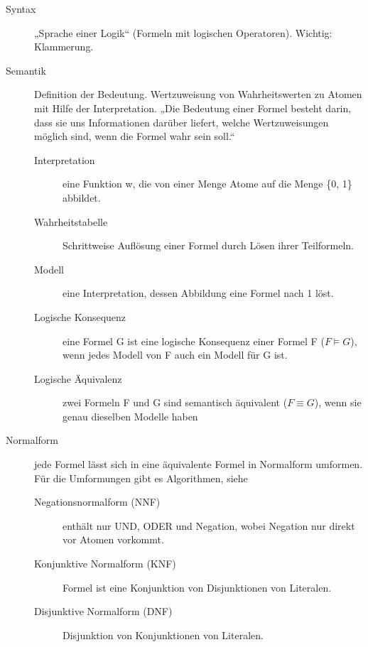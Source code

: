 \begin{description}
        \item[Syntax] „Sprache einer Logik“ (Formeln mit logischen Operatoren). Wichtig: Klammerung.
        \item[Semantik] Definition der Bedeutung. Wertzuweisung von Wahrheitswerten zu Atomen mit Hilfe der Interpretation.
            „Die Bedeutung einer Formel besteht darin, dass sie uns Informationen darüber liefert, welche Wertzuweisungen möglich sind, wenn die Formel wahr sein soll.“
            \begin{description}
                \item[Interpretation] eine Funktion w, die von einer Menge Atome auf die Menge \{0, 1\} abbildet.
                \item[Wahrheitstabelle] Schrittweise Auflösung einer Formel durch Lösen ihrer Teilformeln.
                \item[Modell] eine Interpretation, dessen Abbildung eine Formel nach 1 löst.
                \item[Logische Konsequenz] eine Formel G ist eine logische Konsequenz einer Formel F ($F \models G$), wenn jedes Modell von F auch ein Modell für G ist.
                \item[Logische Äquivalenz] zwei Formeln F und G sind semantisch äquivalent ($F \equiv G$), wenn sie genau dieselben Modelle haben 
            \end{description}

        \item[Normalform] jede Formel lässt sich in eine äquivalente Formel in Normalform umformen. \\ Für die Umformungen gibt es Algorithmen, siehe 
            \begin{description}
                \item[Negationsnormalform (NNF)] enthält nur UND, ODER und Negation, wobei Negation nur direkt vor Atomen vorkommt.
                \item[Konjunktive Normalform (KNF)] Formel ist eine Konjunktion von Disjunktionen von Literalen.
                \item[Disjunktive Normalform (DNF)] Disjunktion von Konjunktionen von Literalen.
            \end{description}


    \end{description}


\newpage
